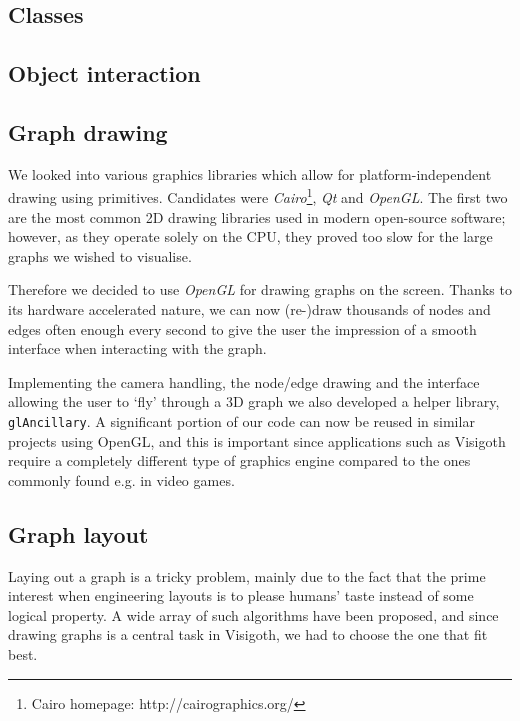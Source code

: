 \documentclass[a4paper,11pt,titlepage]{article}
\newcommand{\code}[1]{\texttt{#1}}
\newcommand{\buzz}[1]{\emph{#1}}
\begin{document}
\subsection{Classes}

\subsection{Object interaction}
\label{interaction}

\subsection{Graph drawing}

We looked into various graphics libraries which allow for
platform-independent drawing using primitives. Candidates were
\buzz{Cairo}\footnote{Cairo homepage: http://cairographics.org/},
\buzz{Qt} and \buzz{OpenGL}. The first two are the
most common 2D drawing libraries used in modern open-source
software; however, as they operate solely on the CPU, they proved
too slow for the large graphs we wished to visualise.

Therefore we decided to use \buzz{OpenGL} for drawing graphs on
the screen. Thanks to its hardware accelerated nature, we can now
(re-)draw thousands of nodes and edges often enough every second
to give the user the impression of a smooth interface when interacting
with the graph.

Implementing the camera handling, the node/edge drawing and the
interface allowing the user to `fly' through a 3D graph we also
developed a helper library, \code{glAncillary}. A significant portion
of our code can now be reused in similar projects using OpenGL,
and this is important since applications such as Visigoth require a
completely different type of graphics engine compared to the ones
commonly found e.g. in video games.


\subsection{Graph layout}
Laying out a graph is a tricky problem, mainly due to the fact that the
prime interest when engineering layouts is to please humans' taste
instead of some logical property. A wide array of such algorithms have
been proposed, and since drawing graphs is a central task in Visigoth,
we had to choose the one that fit best.
\end{document}
